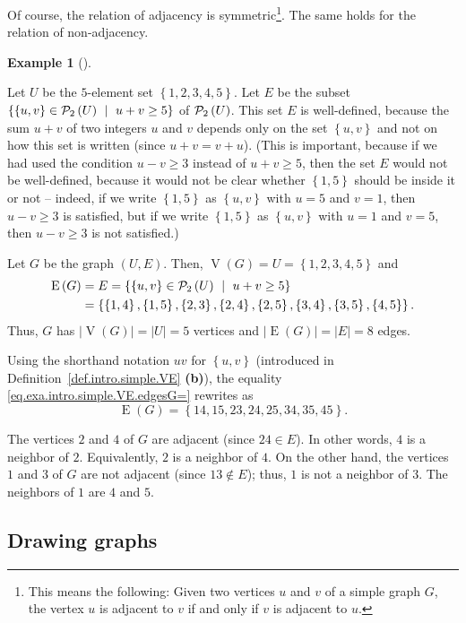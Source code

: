\documentclass[numbers=enddot,12pt,final,onecolumn,notitlepage]{scrartcl}%
\theoremstyle{definition}
\newtheorem{exam}[theo]{Example}
\newenvironment{example}[1][]
{\begin{exam}[#1]\begin{leftbar}}
{\end{leftbar}\end{exam}}
\newcommand{\powset}[2][]{\ifthenelse{\equal{#2}{}}{\mathcal{P}\left(#1\right)}{\mathcal{P}_{#1}\left(#2\right)}}
\newcommand{\set}[1]{\left\{ #1 \right\}}
\newcommand{\abs}[1]{\left| #1 \right|}
\newcommand{\tup}[1]{\left( #1 \right)}
\newcommand{\verts}[1]{\operatorname{V}\left( #1 \right)}
\newcommand{\edges}[1]{\operatorname{E}\left( #1 \right)}
\begin{document}
Of course, the relation of adjacency is symmetric\footnote{This means
the following: Given two vertices $u$ and $v$ of a simple graph $G$,
the vertex $u$ is adjacent to $v$ if and only if $v$ is adjacent to
$u$.}. The same holds for the relation of non-adjacency.

\begin{example} \label{exa.intro.simple.VE}
Let $U$ be the $5$-element set $\set{1,2,3,4,5}$. Let $E$ be the
subset $\set{\set{u,v} \in \powset[2]{U} \ \mid \ u + v \geq 5 }$
of $\powset[2]{U}$. This set $E$ is well-defined, because the sum
$u + v$ of two integers $u$ and $v$ depends only on the set
$\set{u,v}$ and not on how this set is written (since
$u + v = v + u$). (This is important, because if we had used the
condition $u - v \geq 3$ instead of $u + v \geq 5$, then the set $E$
would not be well-defined, because it would not be clear whether
$\set{1, 5}$ should be inside it or not -- indeed, if we write
$\set{1, 5}$ as $\set{u, v}$ with $u = 5$ and $v = 1$, then
$u - v \geq 3$ is satisfied, but if we write $\set{1, 5}$ as
$\set{u, v}$ with $u = 1$ and $v = 5$, then $u - v \geq 3$ is not
satisfied.)

Let $G$ be the graph $\tup{U, E}$. Then, $\verts{G} = U
= \set{1,2,3,4,5}$ and
\begin{align}
\edges{G} &= E
= \set{\set{u,v} \in \powset[2]{U} \ \mid \ u + v \geq 5 }
\nonumber \\
&= \set{\set{1,4}, \set{1,5},
        \set{2,3}, \set{2,4}, \set{2,5},
        \set{3,4}, \set{3,5},
        \set{4,5}} .
\label{eq.exa.intro.simple.VE.edgesG=}
\end{align}
Thus, $G$ has $\abs{\verts{G}} = \abs{U} = 5$ vertices and
$\abs{\edges{G}} = \abs{E} = 8$ edges.

Using the shorthand notation
$uv$ for $\set{u, v}$ (introduced in
Definition~\ref{def.intro.simple.VE} \textbf{(b)}), the equality
\eqref{eq.exa.intro.simple.VE.edgesG=} rewrites as
\[
\edges{G}
= \set{14, 15, 23, 24, 25, 34, 35, 45} .
\]

The vertices $2$ and $4$ of $G$ are adjacent (since $24 \in E$).
In other words, $4$ is a neighbor of $2$. Equivalently, $2$ is a
neighbor of $4$. On the other hand, the vertices $1$ and $3$ of $G$
are not adjacent (since $13 \notin E$); thus, $1$ is not a neighbor
of $3$. The neighbors of $1$ are $4$ and $5$.
\end{example}

\subsection{\label{sect.intro.draw}Drawing graphs}
\end{document}
